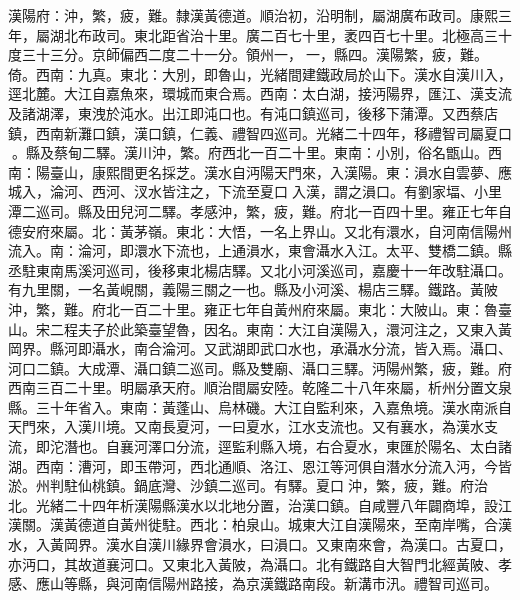 \begin{pinyinscope}
漢陽府：沖，繁，疲，難。隸漢黃德道。順治初，沿明制，屬湖廣布政司。康熙三年，屬湖北布政司。東北距省治十里。廣二百七十里，袤四百七十里。北極高三十度三十三分。京師偏西二度二十一分。領州一，一，縣四。漢陽繁，疲，難。倚。西南：九真。東北：大別，即魯山，光緒間建鐵政局於山下。漢水自漢川入，逕北麓。大江自嘉魚來，環城而東合焉。西南：太白湖，接沔陽界，匯江、漢支流及諸湖澤，東洩於沌水。出江即沌口也。有沌口鎮巡司，後移下蒲潭。又西蔡店鎮，西南新灘口鎮，漢口鎮，仁義、禮智四巡司。光緒二十四年，移禮智司屬夏口。縣及蔡甸二驛。漢川沖，繁。府西北一百二十里。東南：小別，俗名甑山。西南：陽臺山，康熙間更名採芝。漢水自沔陽天門來，入漢陽。東：溳水自雲夢、應城入，淪河、西河、汊水皆注之，下流至夏口入漢，謂之溳口。有劉家堛、小里潭二巡司。縣及田兒河二驛。孝感沖，繁，疲，難。府北一百四十里。雍正七年自德安府來屬。北：黃茅嶺。東北：大悟，一名上界山。又北有澴水，自河南信陽州流入。南：淪河，即澴水下流也，上通溳水，東會灄水入江。太平、雙橋二鎮。縣丞駐東南馬溪河巡司，後移東北楊店驛。又北小河溪巡司，嘉慶十一年改駐灄口。有九里關，一名黃峴關，義陽三關之一也。縣及小河溪、楊店三驛。鐵路。黃陂沖，繁，難。府北一百二十里。雍正七年自黃州府來屬。東北：大陂山。東：魯臺山。宋二程夫子於此築臺望魯，因名。東南：大江自漢陽入，澴河注之，又東入黃岡界。縣河即灄水，南合淪河。又武湖即武口水也，承灄水分流，皆入焉。灄口、河口二鎮。大成潭、灄口鎮二巡司。縣及雙廟、灄口三驛。沔陽州繁，疲，難。府西南三百二十里。明屬承天府。順治間屬安陸。乾隆二十八年來屬，析州分置文泉縣。三十年省入。東南：黃蓬山、烏林磯。大江自監利來，入嘉魚境。漢水南派自天門來，入漢川境。又南長夏河，一曰夏水，江水支流也。又有襄水，為漢水支流，即沱潛也。自襄河澤口分流，逕監利縣入境，右合夏水，東匯於陽名、太白諸湖。西南：漕河，即玉帶河，西北通順、洛江、恩江等河俱自潛水分流入沔，今皆淤。州判駐仙桃鎮。鍋底灣、沙鎮二巡司。有驛。夏口沖，繁，疲，難。府治北。光緒二十四年析漢陽縣漢水以北地分置，治漢口鎮。自咸豐八年闢商埠，設江漢關。漢黃德道自黃州徙駐。西北：柏泉山。城東大江自漢陽來，至南岸嘴，合漢水，入黃岡界。漢水自漢川緣界會溳水，曰溳口。又東南來會，為漢口。古夏口，亦沔口，其故道襄河口。又東北入黃陂，為灄口。北有鐵路自大智門北經黃陂、孝感、應山等縣，與河南信陽州路接，為京漢鐵路南段。新溝市汛。禮智司巡司。


\end{pinyinscope}
